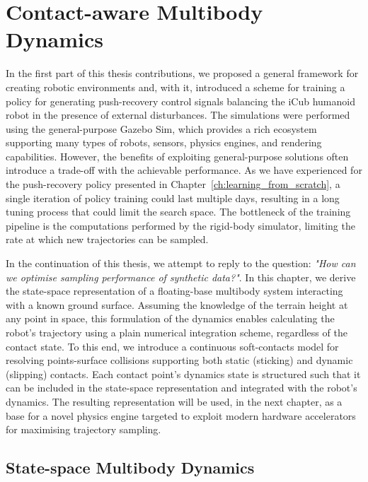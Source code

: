 \acresetall
\chapter{Contact-aware Multibody Dynamics}
\label{ch:contact_aware_dynamics}

In the first part of this thesis contributions, we proposed a general framework for creating robotic environments and, with it, introduced a scheme for training a policy for generating push-recovery control signals balancing the iCub humanoid robot in the presence of external disturbances.
The simulations were performed using the general-purpose Gazebo Sim, which provides a rich ecosystem supporting many types of robots, sensors, physics engines, and rendering capabilities.
However, the benefits of exploiting general-purpose solutions often introduce a trade-off with the achievable performance.
As we have experienced for the push-recovery policy presented in Chapter~\ref{ch:learning_from_scratch}, a single iteration of policy training could last multiple days, resulting in a long tuning process that could limit the search space.
The bottleneck of the training pipeline is the computations performed by the rigid-body simulator, limiting the rate at which new trajectories can be sampled.

In the continuation of this thesis, we attempt to reply to the question: \textit{"How can we optimise sampling performance of synthetic data?"}.
In this chapter, we derive the state-space representation of a floating-base multibody system interacting with a known ground surface.
Assuming the knowledge of the terrain height at any point in space, this formulation of the dynamics enables calculating the robot's trajectory using a plain numerical integration scheme, regardless of the contact state.
To this end, we introduce a continuous soft-contacts model for resolving points-surface collisions supporting both static (sticking) and dynamic (slipping) contacts.
Each contact point's dynamics state is structured such that it can be included in the state-space representation and integrated with the robot's dynamics.
The resulting representation will be used, in the next chapter, as a base for a novel physics engine targeted to exploit modern hardware accelerators for maximising trajectory sampling.

\section{State-space Multibody Dynamics}

